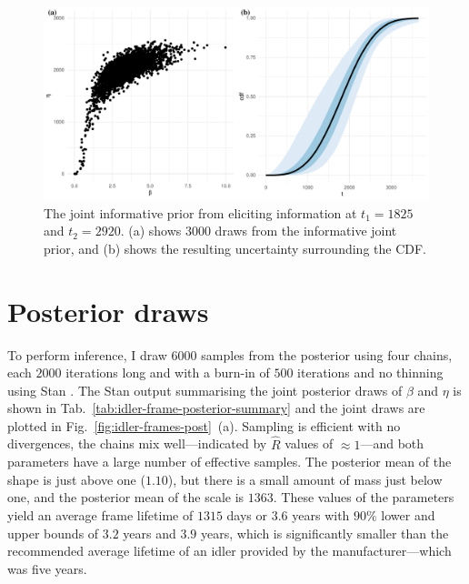 \begin{figure}
  \centering
  \includegraphics[width=1\textwidth]{./figures/ch-3/idler-frame-prior.pdf}
  \caption{The joint informative prior from eliciting information at $t_1 = 1825$ and $t_2 = 2920$. (a) shows 3000 draws from the informative joint prior, and (b) shows the resulting uncertainty surrounding the CDF.}
  \label{fig:idler-frames-prior}
\end{figure}

\section{Posterior draws} \label{sec:idler-frame-posterior}

To perform inference, I draw $6000$ samples from the posterior using four chains, each $2000$ iterations long and with a burn-in of $500$ iterations and no thinning using Stan \citep{Stan2022}. The Stan output summarising the joint posterior draws of $\beta$ and $\eta$ is shown in Tab.~\ref{tab:idler-frame-posterior-summary} and the joint draws are plotted in Fig.~\ref{fig:idler-frames-post}~(a). Sampling is efficient with no divergences, the chains mix well---indicated by $\hat{R}$ values of $\approx 1$---and both parameters have a large number of effective samples. The posterior mean of the shape is just above one ($1.10$), but there is a small amount of mass just below one, and the posterior mean of the scale is $1363$. These values of the parameters yield an average frame lifetime of $1315$ days or $3.6$ years with $90\%$ lower and upper bounds of $3.2$ years and $3.9$ years, which is significantly smaller than the recommended average lifetime of an idler provided by the manufacturer---which was five years.



